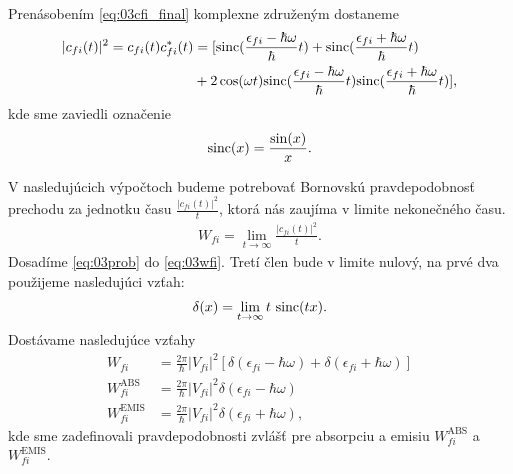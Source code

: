 Prenásobením \eqref{eq:03cfi_final} komplexne združeným dostaneme
\begin{align}
\label{eq:03prob}
|c_{fi}(t)|^2=c_{fi}(t)c_{fi}^*(t)&=[\mathrm{sinc}(\frac{\epsilon_{fi}-\hbar\omega}{\hbar}t)+\mathrm{sinc}(\frac{\epsilon_{fi}+\hbar\omega}{\hbar}t)\\
&+2\cos(\omega t)\mathrm{sinc}(\frac{\epsilon_{fi}-\hbar\omega}{\hbar}t)\mathrm{sinc}(\frac{\epsilon_{fi}+\hbar\omega}{\hbar}t)]\text{,} \notag
\end{align}
kde sme zaviedli označenie 
\begin{align}
\mathrm{sinc}(x)=\frac{\sin(x)}{x}\text{.}
\end{align}

V nasledujúcich výpočtoch budeme potrebovať Bornovskú pravdepodobnosť prechodu za jednotku času $\frac{|c_{fi}(t)|^2}{t}$, ktorá nás zaujíma v limite nekonečného času.
\begin{align}
\label{eq:03wfi}
W_{fi}=\lim_{t\to \infty} \frac{|c_{fi}(t)|^2}{t} \text{.}
\end{align}
Dosadíme \eqref{eq:03prob} do  \eqref{eq:03wfi}. Tretí člen bude v limite nulový, na prvé dva použijeme nasledujúci vzťah:
\begin{align}
\delta(x)=\lim_{t\to \infty}t\ \mathrm{sinc}(tx) \text{.}
\end{align}
Dostávame nasledujúce vzťahy
\begin{align}
W_{fi}&=\frac{2\pi}{\hbar}|V_{fi}|^2[\delta(\epsilon_{fi}-\hbar\omega)+\delta(\epsilon_{fi}+\hbar\omega)]\\
W_{fi}^{\mathrm{ABS}}&=\frac{2\pi}{\hbar}|V_{fi}|^2\delta(\epsilon_{fi}-\hbar\omega)\\
W_{fi}^{\mathrm{EMIS}}&=\frac{2\pi}{\hbar}|V_{fi}|^2\delta(\epsilon_{fi}+\hbar\omega)\text{,}
\end{align}
kde sme zadefinovali pravdepodobnosti zvlášť pre absorpciu a emisiu $W_{fi}^{\mathrm{ABS}}$ a $W_{fi}^{\mathrm{EMIS}}$.

